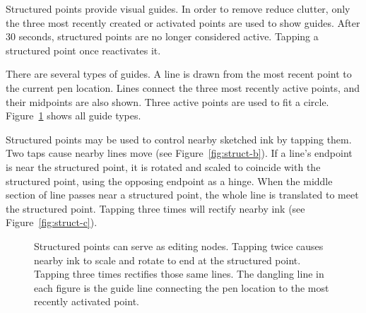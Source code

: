 \documentclass{egpubl}
\begin{document}
Structured points provide visual guides. In order to remove reduce
clutter, only the three most recently created or activated points are
used to show guides. After 30 seconds, structured points are no longer
considered active. Tapping a structured point once reactivates it.

There are several types of guides. A line is drawn from the most
recent point to the current pen location. Lines connect the three most
recently active points, and their midpoints are also shown. Three
active points are used to fit a circle. Figure~\ref{fig:struct} shows
all guide types.

Structured points may be used to control nearby sketched ink by
tapping them. Two taps cause nearby lines move (see
Figure~\ref{fig:struct-b}). If a line's endpoint is near the
structured point, it is rotated and scaled to coincide with the
structured point, using the opposing endpoint as a hinge. When the
middle section of line passes near a structured point, the whole line
is translated to meet the structured point. Tapping three times will
rectify nearby ink (see Figure~\ref{fig:struct-c}).

\begin{figure}
  \centering {}
\hspace{0.2cm} 
\hspace{0.2cm} 
  \caption{Structured points can serve as editing nodes. Tapping twice
    causes nearby ink to scale and rotate to end at the structured
    point. Tapping three times rectifies those same lines. The
    dangling line in each figure is the guide line connecting the pen
    location to the most recently activated point. }
  \label{fig:struct}
\end{figure}
\end{document}
